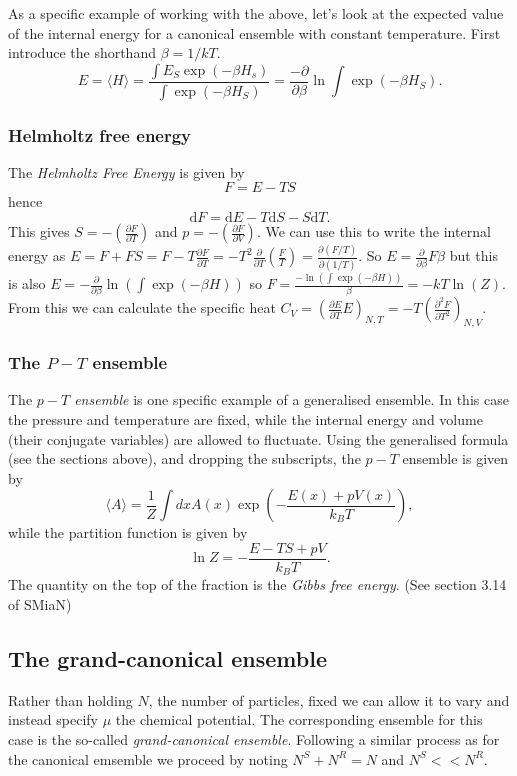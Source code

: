 As a specific example of working with the above, let's look at the expected value of the internal energy for a canonical ensemble with constant temperature. First introduce the shorthand $\beta = 1/kT$.
$$
	E = \langle H \rangle = \frac{\int E_S\exp(-\beta H_s)}{\int{\exp(-\beta H_S)}} = \frac{-\partial}{\partial \beta}\ln\int\exp(-\beta H_S).
$$

\subsubsection{Helmholtz free energy}
The \emph{Helmholtz Free Energy} is given by
$$
	F = E - TS
$$
hence
$$
	\mathrm{d}F = \mathrm{d}E - T\mathrm{d}S - S\mathrm{d}T.
$$
This gives $S= -\left(\frac{\partial F}{\partial T}\right)$ and $p = -\left(\frac{\partial F}{\partial V}\right)$. We can use this to write the  internal energy as $E=F+FS=F-T\frac{\partial F}{\partial T}=-T^2\frac{\partial}{\partial T}\left(\frac{F}{T}\right) = \frac{\partial (F/T)}{\partial (1/T)}$. So $E = \frac{\partial}{\partial \beta} F\beta$ but this is also $E = -\frac{\partial}{\partial\beta}\ln(\int\exp(-\beta H))$ so $F= \frac{-\ln(\int\exp(-\beta H))}{\beta} = -kT\ln(Z)$. From this we can calculate the specific heat $C_V = \left(\frac{\partial E}{\partial T} E\right)_{N,T} = -T\left(\frac{\partial^2 F}{\partial T^2}\right)_{N,V}$.


\subsubsection{The $P-T$ ensemble}
The \emph{$p-T$ ensemble} is one specific example of a generalised ensemble. In this case the pressure and temperature are fixed, while the internal energy and volume (their conjugate variables) are allowed to fluctuate.
Using the generalised formula (see the sections above), and dropping the subscripts, the $p-T$ ensemble is given by
 \begin{equation*}
	\langle A\rangle = \frac{1}{Z}\int dxA(x)\exp\left(-\frac{E(x)+pV(x)}{k_BT}\right),
\end{equation*}
while the partition function is given by
$$
	\ln Z = -\frac{E-TS+pV}{k_BT}.
$$
The quantity on the top of the fraction is the \emph{Gibbs free energy}. (See section 3.14 of SMiaN)


\subsection{The grand-canonical ensemble}
Rather than holding $N$, the number of particles, fixed we can allow it to vary and instead specify $\mu$ the chemical potential. The corresponding ensemble for this case is the so-called \emph{grand-canonical ensemble}. Following a similar process as for the canonical emsemble we proceed by noting $N^S+N^R = N$ and $N^S<<N^R$. 

